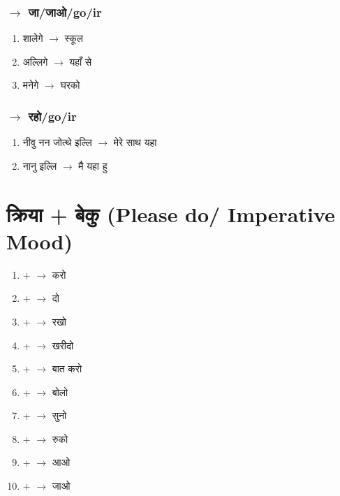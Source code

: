 \documentclass{article}
\begin{document}
\subsubsection{ \s {} $\longrightarrow$  जा/जाओ/go/ir }
\begin{enumerate}
    \item {\s शालेगे   } $\longrightarrow$ {\s  स्कूल }
    \item {\s अल्लिगे  $\longrightarrow$  यहाँ से  }
    \item {\s मनेगे  $\longrightarrow$  घरको   }    
\end{enumerate}

\subsubsection{ \s {} $\longrightarrow$  रहो/go/ir }
\begin{enumerate}
    \item {\s नीवु नन जोत्थे इल्लि   $\longrightarrow$   मेरे साथ यहा   }
    \item {\s नानु इल्लि  $\longrightarrow$ मै यहा  हु}
\end{enumerate}




\section{\s क्रिया + बेकु (Please do/ Imperative Mood)}
\begin{multicols}{2}
\begin{enumerate}
    \item {\s {} +  $\longrightarrow$ \s  करो } 
    \item {\s {} +  $\longrightarrow$  दो  } 
    \item {\s {} +  $\longrightarrow$  रखो  } 
    \item {\s {} +  $\longrightarrow$ खरीदो }
    \item {\s {} +  $\longrightarrow$ बात  करो }
    \item {\s {} +  $\longrightarrow$  बोलो }
    \item {\s {} +  $\longrightarrow$  सुनो }
    \item {\s {} +  $\longrightarrow$ रुको }
    \item {\s {} +  $\longrightarrow$ आओ }
    \item {\s {} +  $\longrightarrow$ जाओ }        
\end{enumerate}
\end{multicols}
\end{document}
